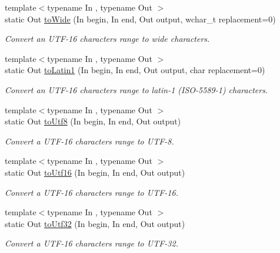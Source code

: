 \begin{DoxyCompactItemize}
{\footnotesize template$<$typename In , typename Out $>$ }\\static Out \hyperlink{classsf_1_1_utf_3_0116_01_4_a42bace5988f7f20497cfdd6025c2d7f2}{to\-Wide} (In begin, In end, Out output, wchar\-\_\-t replacement=0)
\begin{DoxyCompactList}\small\item\em Convert an U\-T\-F-\/16 characters range to wide characters. \end{DoxyCompactList}\item 
{\footnotesize template$<$typename In , typename Out $>$ }\\static Out \hyperlink{classsf_1_1_utf_3_0116_01_4_ad0cc57ebf48fac584f4d5f3d30a20010}{to\-Latin1} (In begin, In end, Out output, char replacement=0)
\begin{DoxyCompactList}\small\item\em Convert an U\-T\-F-\/16 characters range to latin-\/1 (I\-S\-O-\/5589-\/1) characters. \end{DoxyCompactList}\item 
{\footnotesize template$<$typename In , typename Out $>$ }\\static Out \hyperlink{classsf_1_1_utf_3_0116_01_4_afdd2f31536ce3fba4dfb632dfdd6e4b7}{to\-Utf8} (In begin, In end, Out output)
\begin{DoxyCompactList}\small\item\em Convert a U\-T\-F-\/16 characters range to U\-T\-F-\/8. \end{DoxyCompactList}\item 
{\footnotesize template$<$typename In , typename Out $>$ }\\static Out \hyperlink{classsf_1_1_utf_3_0116_01_4_a0c9744c8f142360a8afebb24da134b34}{to\-Utf16} (In begin, In end, Out output)
\begin{DoxyCompactList}\small\item\em Convert a U\-T\-F-\/16 characters range to U\-T\-F-\/16. \end{DoxyCompactList}\item 
{\footnotesize template$<$typename In , typename Out $>$ }\\static Out \hyperlink{classsf_1_1_utf_3_0116_01_4_a781174f776a3effb96c1ccd9a4513ab1}{to\-Utf32} (In begin, In end, Out output)
\begin{DoxyCompactList}\small\item\em Convert a U\-T\-F-\/16 characters range to U\-T\-F-\/32. \end{DoxyCompactList}\item 

\end{DoxyCompactItemize}
